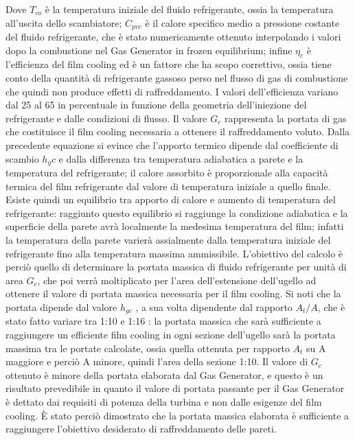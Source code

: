Dove $T_{co}$ è la temperatura iniziale del fluido refrigerante, ossia la temperatura all'uscita dello scambiatore; $C_{pvc}$ è il calore specifico medio a pressione costante del fluido refrigerante, che è stato numericamente ottenuto interpolando i valori dopo la combustione nel Gas Generator in frozen equilibrium; infine $\eta_{c}$ è l'efficienza del film cooling ed è un fattore che ha scopo correttivo, ossia tiene conto della quantità di refrigerante gassoso perso nel flusso di gas di combustione che quindi non produce effetti di raffreddamento. I valori dell'efficienza variano dal 25 al 65 in percentuale in funzione della geometria dell'iniezione del refrigerante e dalle condizioni di flusso. Il valore $G_c$ rappresenta la portata di gas che costituisce il film cooling necessaria a ottenere il raffreddamento voluto.
Dalla precedente equazione si evince che l'apporto termico dipende dal coefficiente di scambio $h_gc$ e dalla differenza tra temperatura adiabatica a parete e la temperatura del refrigerante; il calore assorbito è proporzionale alla capacità termica del film refrigerante dal valore di temperatura iniziale a quello finale. Esiste quindi un equilibrio tra apporto di calore e aumento di temperatura del refrigerante: raggiunto questo equilibrio si raggiunge la condizione adiabatica e la superficie della parete avrà localmente la medesima temperatura del film; infatti la temperatura della parete varierà assialmente dalla temperatura iniziale del refrigerante fino alla temperatura massima ammissibile.
L'obiettivo del calcolo è perciò quello di determinare la portata massica di fluido refrigerante per unità di area $G_c$, che poi verrà moltiplicato per l'area dell'estensione dell'ugello ad ottenere il valore di portata massica necessaria per il film cooling. Si noti che la portata dipende dal valore $h_{gc}$ , a sua volta dipendente dal rapporto $A_t/A$, che è stato fatto variare tra 1:10 e 1:16 : la portata massica che sarà sufficiente a raggiungere un efficiente film cooling in ogni sezione dell'ugello sarà la portata massima tra le portate calcolate, ossia quella ottenuta per rapporto $A_t$ su A maggiore e perciò A minore, quindi l'area della sezione 1:10. Il valore di $G_c$ ottenuto è minore della portata elaborata dal Gas Generator, e questo è un risultato prevedibile in quanto il valore di portata passante per il Gas Generator è dettato dai requisiti di potenza della turbina e non dalle esigenze del film cooling. È stato perciò dimostrato che la portata massica elaborata è sufficiente a raggiungere l'obiettivo desiderato di raffreddamento delle pareti.

